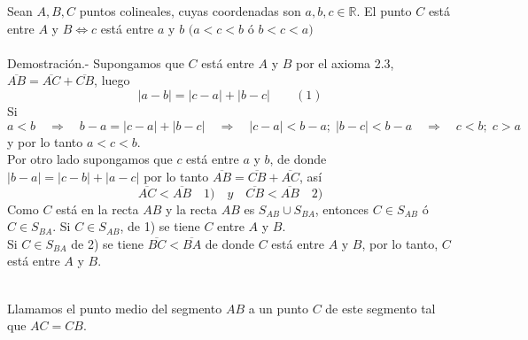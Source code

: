     \begin{teo}
	Sean $A,B,C$ puntos colineales, cuyas coordenadas son $a,b,c \in \mathbb{R}$. El punto $C$ está entre $A$ y $B \Leftrightarrow c$ está entre $a$ y $b$ $(a<c<b$ ó $b<c<a)$\\\\
	    Demostración.-\; Supongamos que $C$ está entre $A$ y $B$ por el axioma 2.3, $\overline{AB} = \overline{AC} + \overline{CB}$, luego $$|a-b| = |c-a| + |b-c| \qquad (1)$$ Si $a<b \quad \Rightarrow \quad b-a = |c-a| + |b-c| \quad \Rightarrow \quad |c-a|<b-a ; \; |b-c|<b-a \quad \Rightarrow \quad c<b ;\; c>a \quad$ y por lo tanto $a<c<b$.\\
	    Por otro lado supongamos que $c$ está entre $a$ y $b$, de donde $|b-a|=|c-b| + |a-c|$ por lo tanto $\overline{AB}=\overline{CB} + \overline{AC}$, así $$\overline{AC}<\overline{AB} \quad 1) \quad y \quad \overline{CB} < \overline{AB} \quad 2)$$
	    Como $C$ está en la recta $AB$ y la recta $AB$ es $S_{AB} \cup S_{BA}$, entonces $C \in S_{AB}$ ó $C\in S_{BA}$. Si $C\in S_{AB}$, de 1) se tiene $C$ entre $A$ y $B$.\\
	    Si $C \in S_{BA}$ de 2) se tiene $\overline{BC}<\overline{BA}$ de donde $C$ está entre $A$ y $B$, por lo tanto, $C$ está entre $A$ y $B$.\\\\
    \end{teo}

\begin{tcolorbox}[colframe=white]
\begin{def.}
    Llamamos el punto medio del segmento $AB$ a un punto $C$ de este segmento tal que $AC = CB$.
\end{def.}
\end{tcolorbox}

